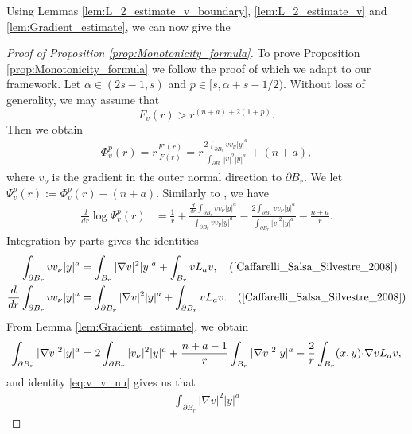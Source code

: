 \documentclass[11pt,reqno]{amsart}
\theoremstyle{definition}
\theoremstyle{remark}
\begin{document}
Using Lemmas \ref{lem:L_2_estimate_v_boundary}, \ref{lem:L_2_estimate_v} and \ref{lem:Gradient_estimate}, we can now give the
\begin{proof}[Proof of Proposition \ref{prop:Monotonicity_formula}]
To prove Proposition \ref{prop:Monotonicity_formula} we follow the proof of \cite[Theorem 3.1]{Caffarelli_Salsa_Silvestre_2008} which we adapt to our framework. Let $\alpha\in (2s-1,s)$ and $p \in [s,\alpha+s-1/2)$. Without loss of generality, we may assume that
\begin{equation}
\label{eq:Ineq_F_v_r}
F_v(r) > r^{(n+a)+2(1+p)}.
\end{equation}
Then we obtain
\begin{align}
\label{eq:Identity_Phi_p}
\Phi^p_v(r) = r\frac{F'(r)}{F(r)}= r\frac{2\int_{\partial B_r} v v_{\nu}|y|^a}{\int_{\partial B_r} |v|^2 |y|^a} + (n+a),
\end{align}
where $v_{\nu}$ is the gradient in the outer normal direction to $\partial B_r$. We let $\Psi^p_v(r):=\Phi^p_v(r)-(n+a)$. Similarly to \cite[Identity (7.11)]{Caffarelli_Salsa_Silvestre_2008}, we have 
\begin{align}
\label{eq:Derivative_phi_p}
\frac{d}{dr}\log \Psi^p_v(r) &= \frac{1}{r} +\frac{\frac{d}{dr} \int_{\partial B_r} v v_{\nu}|y|^a}{\int_{\partial B_r} v v_{\nu}|y|^a}
-\frac{2\int_{\partial B_r} v v_{\nu}|y|^a}{\int_{\partial B_r} |v|^2|y|^a}- \frac{n+a}{r}.
\end{align}
Integration by parts gives the identities
\begin{align}
\label{eq:v_v_nu}
\int_{\partial B_r} v v_{\nu}|y|^a &=\int_{B_r} |\nabla v|^2 |y|^a + \int_{B_r} v L_a v,\quad\hbox{(\cite[Identity (7.12)]{Caffarelli_Salsa_Silvestre_2008})}\\
\label{eq:derivative_v_v_nu}
\frac{d}{dr}\int_{\partial B_r} v v_{\nu}|y|^a &=\int_{\partial B_r} |\nabla v|^2 |y|^a + \int_{\partial B_r} v L_a v. \quad\hbox{(\cite[Identity (7.13)]{Caffarelli_Salsa_Silvestre_2008})}
\end{align}
From Lemma \ref{lem:Gradient_estimate}, we obtain
\begin{align*}
\int_{\partial B_r} |\nabla v|^2 |y|^a 
&= 2\int_{\partial B_r} |v_{\nu}|^2 |y|^a + \frac{n+a-1}{r} \int_{B_r} |\nabla v|^2 |y|^a -\frac{2}{r} \int_{B_r} (x,y){\hbox{$\cdot$}} \nabla v L_a v,\\
\end{align*}
and identity  \eqref{eq:v_v_nu} gives us that
\begin{align*}
\int_{\partial B_r} |\nabla v|^2 |y|^a 

\end{align*}
\end{proof}
\end{document}
